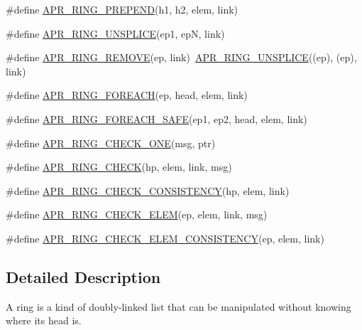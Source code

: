 \begin{DoxyCompactItemize}
\item 
\#define \hyperlink{group__apr__ring_ga4d5aaa9b6f02f96f98f234a0a428474d}{A\+P\+R\+\_\+\+R\+I\+N\+G\+\_\+\+P\+R\+E\+P\+E\+ND}(h1,  h2,  elem,  link)
\item 
\#define \hyperlink{group__apr__ring_ga1d725b0a9ea7ff88f771e37ec130c13b}{A\+P\+R\+\_\+\+R\+I\+N\+G\+\_\+\+U\+N\+S\+P\+L\+I\+CE}(ep1,  epN,  link)
\item 
\#define \hyperlink{group__apr__ring_gaab4a57544bdb660ec1e306137387d9d7}{A\+P\+R\+\_\+\+R\+I\+N\+G\+\_\+\+R\+E\+M\+O\+VE}(ep,  link)~\hyperlink{group__apr__ring_ga1d725b0a9ea7ff88f771e37ec130c13b}{A\+P\+R\+\_\+\+R\+I\+N\+G\+\_\+\+U\+N\+S\+P\+L\+I\+CE}((ep), (ep), link)
\item 
\#define \hyperlink{group__apr__ring_gab5ac1b1fc25a0764f6c6fafdb1217fea}{A\+P\+R\+\_\+\+R\+I\+N\+G\+\_\+\+F\+O\+R\+E\+A\+CH}(ep,  head,  elem,  link)                                                
\item 
\#define \hyperlink{group__apr__ring_gaed113ac9476193c638dd3e32b158e181}{A\+P\+R\+\_\+\+R\+I\+N\+G\+\_\+\+F\+O\+R\+E\+A\+C\+H\+\_\+\+S\+A\+FE}(ep1,  ep2,  head,  elem,  link)                          
\item 
\#define \hyperlink{group__apr__ring_ga33c7cfbea7c688c7bd0a3d36609f318b}{A\+P\+R\+\_\+\+R\+I\+N\+G\+\_\+\+C\+H\+E\+C\+K\+\_\+\+O\+NE}(msg,  ptr)
\item 
\#define \hyperlink{group__apr__ring_ga97bb4dcc313145496e6b05855f9c6e2b}{A\+P\+R\+\_\+\+R\+I\+N\+G\+\_\+\+C\+H\+E\+CK}(hp,  elem,  link,  msg)
\item 
\#define \hyperlink{group__apr__ring_ga6b0f2091527ee9c7a1511cb6f172a0a7}{A\+P\+R\+\_\+\+R\+I\+N\+G\+\_\+\+C\+H\+E\+C\+K\+\_\+\+C\+O\+N\+S\+I\+S\+T\+E\+N\+CY}(hp,  elem,  link)
\item 
\#define \hyperlink{group__apr__ring_ga5500df0e96dea1a3258f1e92b28fea0a}{A\+P\+R\+\_\+\+R\+I\+N\+G\+\_\+\+C\+H\+E\+C\+K\+\_\+\+E\+L\+EM}(ep,  elem,  link,  msg)
\item 
\#define \hyperlink{group__apr__ring_gab7070ae5cf69bf16178a0e0e397c5b38}{A\+P\+R\+\_\+\+R\+I\+N\+G\+\_\+\+C\+H\+E\+C\+K\+\_\+\+E\+L\+E\+M\+\_\+\+C\+O\+N\+S\+I\+S\+T\+E\+N\+CY}(ep,  elem,  link)
\end{DoxyCompactItemize}


\subsection{Detailed Description}
A ring is a kind of doubly-\/linked list that can be manipulated without knowing where its head is. 

